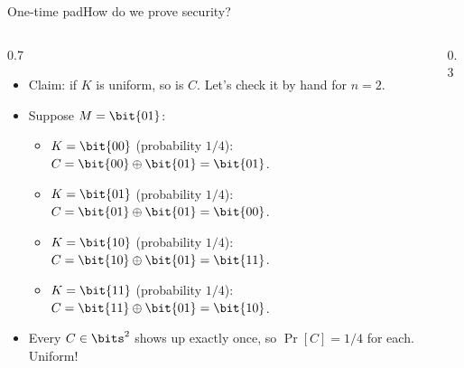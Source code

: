 \ifdefined\PRESENTATION\else\PassOptionsToClass{handout}{beamer}\fi\documentclass[aspectratio=169, lualatex]{beamer}
\begin{document}
\begin{frame}{One-time pad}{How do we prove security?}
	\begin{columns}[c]
		\begin{column}{0.7\textwidth}
			\begin{itemize}[<+->]
				\item Claim: if $K$ is uniform, so is $C$. Let's check it by hand for $n = 2$.
				\item Suppose $M = \bit{01}$:
				      \begin{itemize}[<+->]
					      \item $K = \bit{00}$ (probability $1/4$): $C = \bit{00} \oplus \bit{01} = \bit{01}$.
					      \item $K = \bit{01}$ (probability $1/4$): $C = \bit{01} \oplus \bit{01} = \bit{00}$.
					      \item $K = \bit{10}$ (probability $1/4$): $C = \bit{10} \oplus \bit{01} = \bit{11}$.
					      \item $K = \bit{11}$ (probability $1/4$): $C = \bit{11} \oplus \bit{01} = \bit{10}$.
				      \end{itemize}
				\item Every $C \in \bits^2$ shows up exactly once, so $\Pr[C] = 1/4$ for each. Uniform!
			\end{itemize}
		\end{column}
		\begin{column}{0.3\textwidth}
		\end{column}
	\end{columns}
\end{frame}
\end{document}

